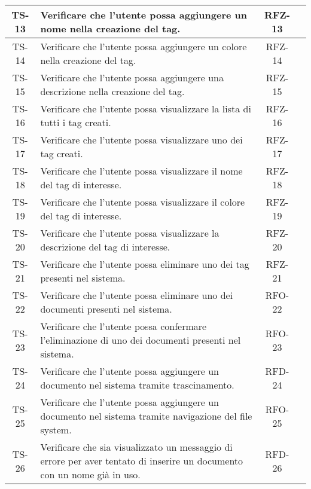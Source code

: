 \begin{xltabular}{\textwidth}{| c | X | c | c |}
    \hline
    TS-13 & Verificare che l’utente possa aggiungere un nome nella creazione del tag. & RFZ-13 & \textcolor{xmarkcolor}{} \\
    \hline
    TS-14 & Verificare che l’utente possa aggiungere un colore nella creazione del tag. & RFZ-14 & \textcolor{xmarkcolor}{} \\
    \hline
    TS-15 & Verificare che l’utente possa aggiungere una descrizione nella creazione del tag. & RFZ-15 & \textcolor{xmarkcolor}{} \\
    \hline
    TS-16 & Verificare che l’utente possa visualizzare la lista di tutti i tag creati. & RFZ-16 & \textcolor{xmarkcolor}{} \\
    \hline
    TS-17 & Verificare che l’utente possa visualizzare uno dei tag creati. & RFZ-17 & \textcolor{xmarkcolor}{} \\
    \hline
    TS-18 & Verificare che l’utente possa visualizzare il nome del tag di interesse. & RFZ-18 & \textcolor{xmarkcolor}{} \\
    \hline
    TS-19 &  Verificare che l’utente possa visualizzare il colore del tag di interesse. & RFZ-19 & \textcolor{xmarkcolor}{} \\
    \hline
    TS-20 & Verificare che l'utente possa visualizzare la descrizione del tag di interesse. & RFZ-20 & \textcolor{xmarkcolor}{} \\
    \hline
    TS-21 & Verificare che l’utente possa eliminare uno dei tag presenti nel sistema. & RFZ-21 & \textcolor{xmarkcolor}{} \\
    \hline
    TS-22 & Verificare che l’utente possa eliminare uno dei documenti presenti nel sistema. & RFO-22 & \textcolor{xmarkcolor}{} \\
    \hline
    TS-23 & Verificare che l’utente possa confermare l’eliminazione di uno dei documenti presenti nel sistema. & RFO-23 & \textcolor{xmarkcolor}{} \\
    \hline
    TS-24 & Verificare che l’utente possa aggiungere un documento nel sistema tramite trascinamento. & RFD-24 & \textcolor{xmarkcolor}{} \\
    \hline
    TS-25 & Verificare che l’utente possa aggiungere un documento nel sistema tramite navigazione del file system. & RFO-25 & \textcolor{xmarkcolor}{} \\
    \hline
    TS-26 & Verificare che sia visualizzato un messaggio di errore per aver tentato di inserire un documento con un nome già in uso. & RFD-26 & \textcolor{xmarkcolor}{} \\

\end{xltabular}
